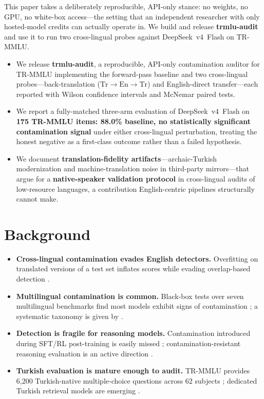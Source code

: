 \documentclass[11pt]{article}
\begin{document}
This paper takes a deliberately reproducible, API-only stance: no weights, no GPU, no white-box access---the setting that an independent researcher with only hosted-model credits can actually operate in. We build and release \textbf{trmlu-audit} and use it to run two cross-lingual probes against DeepSeek~v4~Flash on TR-MMLU.

\begin{itemize}
\item We release \textbf{trmlu-audit}, a reproducible, API-only contamination auditor for TR-MMLU implementing the forward-pass baseline and two cross-lingual probes---back-translation ($\mathrm{Tr}\rightarrow\mathrm{En}\rightarrow\mathrm{Tr}$) and English-direct transfer---each reported with Wilson confidence intervals and McNemar paired tests.
\item We report a fully-matched three-arm evaluation of DeepSeek~v4~Flash on \textbf{175 TR-MMLU items: 88.0\% baseline, no statistically significant contamination signal} under either cross-lingual perturbation, treating the honest negative as a first-class outcome rather than a failed hypothesis.
\item We document \textbf{translation-fidelity artifacts}---archaic-Turkish modernization and machine-translation noise in third-party mirrors---that argue for a \textbf{native-speaker validation protocol} in cross-lingual audits of low-resource languages, a contribution English-centric pipelines structurally cannot make.
\end{itemize}

\section{Background}

\begin{itemize}
\item \textbf{Cross-lingual contamination evades English detectors.} Overfitting on translated versions of a test set inflates scores while evading overlap-based detection \cite{yang2024data}.
\item \textbf{Multilingual contamination is common.} Black-box tests over seven multilingual benchmarks find most models exhibit signs of contamination \cite{contammulti2024}; a systematic taxonomy is given by \cite{taxonomy2024}.
\item \textbf{Detection is fragile for reasoning models.} Contamination introduced during SFT/RL post-training is easily missed \cite{fragile2025reasoning}; contamination-resistant reasoning evaluation is an active direction \cite{beyondbench2025,constat2024}.
\item \textbf{Turkish evaluation is mature enough to audit.} TR-MMLU provides 6{,}200 Turkish-native multiple-choice questions across 62 subjects \cite{trmmu2024}; dedicated Turkish retrieval models are emerging \cite{turkembed2025}.
\end{itemize}
\end{document}
